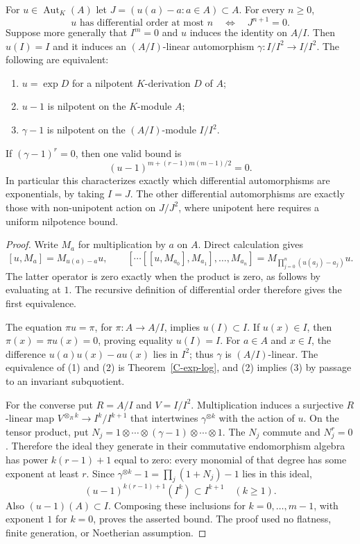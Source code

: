 \begin{theorem}\label{C-differential}
For $u\in\operatorname{Aut}_K(A)$ let
$J=(u(a)-a:a\in A)\subset A$. For every $n\geq0$,
\[
 u\text{ has differential order at most }n
 \quad\Longleftrightarrow\quad J^{n+1}=0.
\]
Suppose more generally that $I^m=0$ and $u$ induces the identity on $A/I$.
Then $u(I)=I$ and it induces an $(A/I)$-linear automorphism
$\gamma:I/I^2\to I/I^2$. The following are equivalent:
\begin{enumerate}
\item $u=\exp D$ for a nilpotent $K$-derivation $D$ of $A$;
\item $u-1$ is nilpotent on the $K$-module $A$;
\item $\gamma-1$ is nilpotent on the $(A/I)$-module $I/I^2$.
\end{enumerate}
If $(\gamma-1)^r=0$, then one valid bound is
\[
 (u-1)^{m+(r-1)m(m-1)/2}=0.
\]
In particular this characterizes exactly which differential automorphisms
are exponentials, by taking $I=J$. The other differential automorphisms
are exactly those with non-unipotent action on $J/J^2$, where unipotent
here requires a uniform nilpotence bound.
\end{theorem}
\begin{proof}
Write $M_a$ for multiplication by $a$ on $A$. Direct calculation gives
\[
 [u,M_a]=M_{u(a)-a}u,
 \qquad
 [\cdots[[u,M_{a_0}],M_{a_1}],\ldots,M_{a_n}]
 =M_{\prod_{j=0}^n(u(a_j)-a_j)}u.
\]
The latter operator is zero exactly when the product is zero, as follows
by evaluating at $1$. The recursive definition of differential order
therefore gives the first equivalence.

The equation $\pi u=\pi$, for $\pi:A\to A/I$, implies $u(I)\subset I$.
If $u(x)\in I$, then $\pi(x)=\pi u(x)=0$, proving equality $u(I)=I$.
For $a\in A$ and $x\in I$, the difference
$u(a)u(x)-a u(x)$ lies in $I^2$; thus $\gamma$ is $(A/I)$-linear.
The equivalence of (1) and (2) is Theorem~\ref{C-exp-log}, and (2)
implies (3) by passage to an invariant subquotient.

For the converse put $R=A/I$ and $V=I/I^2$. Multiplication induces a
surjective $R$-linear map $V^{\otimes_R k}\to I^k/I^{k+1}$ that intertwines
$\gamma^{\otimes k}$ with the action of $u$. On the tensor product, put
$N_j=1\otimes\cdots\otimes(\gamma-1)\otimes\cdots\otimes1$.
The $N_j$ commute and $N_j^r=0$. Therefore the ideal they generate in their
commutative endomorphism algebra has power $k(r-1)+1$ equal to zero:
every monomial of that degree has some exponent at least $r$.
Since $\gamma^{\otimes k}-1=\prod_j(1+N_j)-1$ lies in this ideal,
\[
 (u-1)^{k(r-1)+1}(I^k)\subset I^{k+1}\quad(k\geq1).
\]
Also $(u-1)(A)\subset I$. Composing these inclusions for
$k=0,\ldots,m-1$, with exponent $1$ for $k=0$, proves the asserted bound.
The proof used no flatness, finite generation, or Noetherian assumption.
\end{proof}

